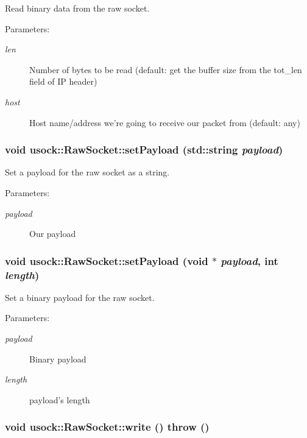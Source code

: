 Read binary data from the raw socket. 

\begin{Desc}
\item[Parameters:]
\begin{description}
\item[{\em len}]Number of bytes to be read (default: get the buffer size from the tot\_\-len field of IP header) \item[{\em host}]Host name/address we're going to receive our packet from (default: any) \end{description}
\end{Desc}
\hypertarget{classusock_1_1RawSocket_ab429ec3a150c6e15175b3223c90ade6}{
\subsubsection[{setPayload}]{\setlength{\rightskip}{0pt plus 5cm}void usock::RawSocket::setPayload (std::string {\em payload})}}
\label{classusock_1_1RawSocket_ab429ec3a150c6e15175b3223c90ade6}


Set a payload for the raw socket as a string. 

\begin{Desc}
\item[Parameters:]
\begin{description}
\item[{\em payload}]Our payload \end{description}
\end{Desc}
\hypertarget{classusock_1_1RawSocket_de9254ad3499aebabedad9b861c21bdb}{
\subsubsection[{setPayload}]{\setlength{\rightskip}{0pt plus 5cm}void usock::RawSocket::setPayload (void $\ast$ {\em payload}, \/  int {\em length})}}
\label{classusock_1_1RawSocket_de9254ad3499aebabedad9b861c21bdb}


Set a binary payload for the raw socket. 

\begin{Desc}
\item[Parameters:]
\begin{description}
\item[{\em payload}]Binary payload \item[{\em length}]payload's length \end{description}
\end{Desc}
\hypertarget{classusock_1_1RawSocket_e62377b0933a176570f226e1acbe3e16}{
\subsubsection[{write}]{\setlength{\rightskip}{0pt plus 5cm}void usock::RawSocket::write ()  throw ()}}
\label{classusock_1_1RawSocket_e62377b0933a176570f226e1acbe3e16}


